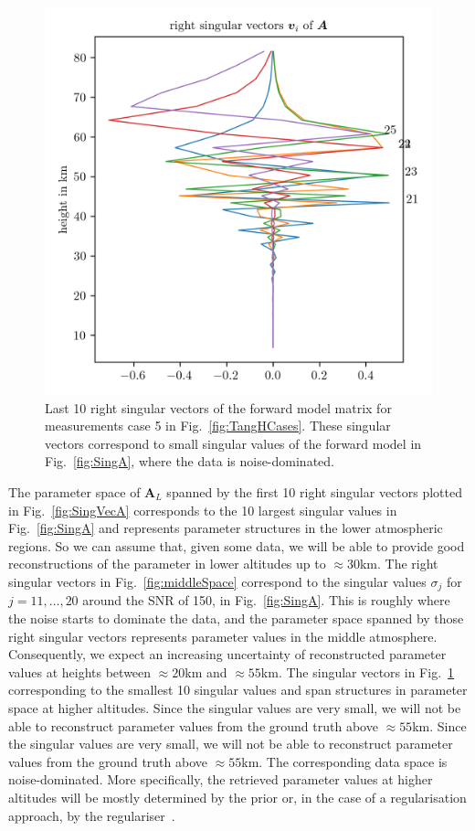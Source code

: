 \begin{figure}[ht!]
	\centering
	\includegraphics{NullVecA.png}
	\caption[Last 10 right singular vectors of forward model.]{Last 10 right singular vectors of the forward model matrix for measurements case 5 in Fig.~\ref{fig:TangHCases}. These singular vectors correspond to small singular values of the forward model in Fig.~\ref{fig:SingA}, where the data is noise-dominated.}
	\label{fig:nullSpace}
\end{figure}
The parameter space of $\bm{A}_L$ spanned by the first 10 right singular vectors plotted in Fig.~\ref{fig:SingVecA} corresponds to the 10 largest singular values in Fig.~\ref{fig:SingA} and represents parameter structures in the lower atmospheric regions.
So we can assume that, given some data, we will be able to provide good reconstructions of the parameter in lower altitudes up to $\approx30$km.
The right singular vectors in Fig.~\ref{fig:middleSpace} correspond to the singular values $\sigma_j$ for $j = 11, \dots, 20$ around the SNR of 150, in Fig.~\ref{fig:SingA}.
This is roughly where the noise starts to dominate the data, and the parameter space spanned by those right singular vectors represents parameter values in the middle atmosphere.
Consequently, we expect an increasing uncertainty of reconstructed parameter values at heights between $\approx20$km and $\approx55$km.
The singular vectors in Fig.~\ref{fig:nullSpace} corresponding to the smallest 10 singular values and span structures in parameter space at higher altitudes.
Since the singular values are very small, we will not be able to reconstruct parameter values from the ground truth above $\approx55$km.
Since the singular values are very small, we will not be able to reconstruct parameter values from the ground truth above $\approx55$km.
The corresponding data space is noise-dominated.
More specifically, the retrieved parameter values at higher altitudes will be mostly determined by the prior or, in the case of a regularisation approach, by the regulariser~\cite{tan2016LecNot}.

